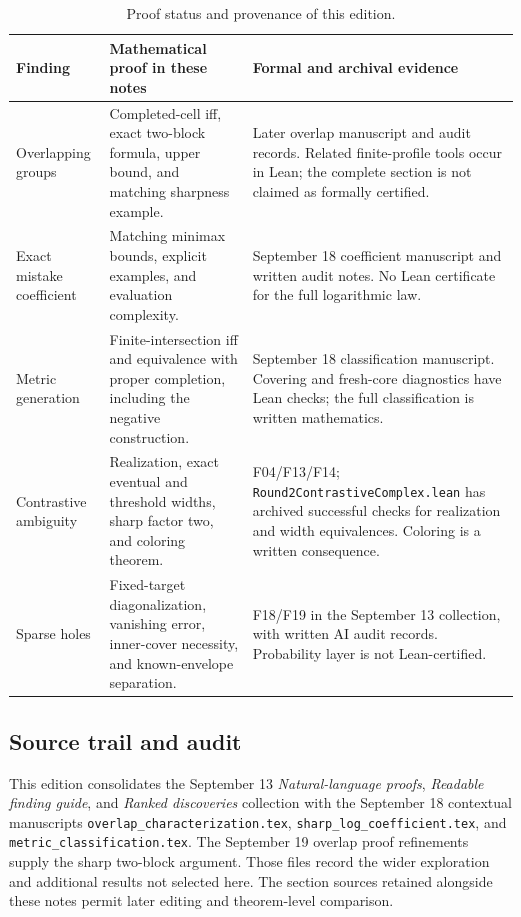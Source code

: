\begin{table}[H]
\centering\small
\caption{Proof status and provenance of this edition.}\label{tab:evidence}
\begin{tabularx}{\textwidth}{@{}p{}Y Y@{}}
\toprule
\textbf{Finding} & \textbf{Mathematical proof in these notes} & \textbf{Formal and archival evidence}\\
\midrule
Overlapping groups & Completed-cell iff, exact two-block formula, upper bound, and matching sharpness example. & Later overlap manuscript and audit records. Related finite-profile tools occur in Lean; the complete section is not claimed as formally certified.\\
\addlinespace
Exact mistake coefficient & Matching minimax bounds, explicit examples, and evaluation complexity. & September 18 coefficient manuscript and written audit notes. No Lean certificate for the full logarithmic law.\\
\addlinespace
Metric generation & Finite-intersection iff and equivalence with proper completion, including the negative construction. & September 18 classification manuscript. Covering and fresh-core diagnostics have Lean checks; the full classification is written mathematics.\\
\addlinespace
Contrastive ambiguity & Realization, exact eventual and threshold widths, sharp factor two, and coloring theorem. & F04/F13/F14; \texttt{Round2ContrastiveComplex.lean} has archived successful checks for realization and width equivalences. Coloring is a written consequence.\\
\addlinespace
Sparse holes & Fixed-target diagonalization, vanishing error, inner-cover necessity, and known-envelope separation. & F18/F19 in the September 13 collection, with written AI audit records. Probability layer is not Lean-certified.\\
\bottomrule
\end{tabularx}
\end{table}

\subsection*{Source trail and audit}
This edition consolidates the September 13 \emph{Natural-language proofs}, \emph{Readable finding guide}, and \emph{Ranked discoveries} collection with the September 18 contextual manuscripts \texttt{overlap\_\allowbreak characterization.tex}, \texttt{sharp\_log\_\allowbreak coefficient.tex}, and \texttt{metric\_\allowbreak classification.tex}. The September 19 overlap proof refinements supply the sharp two-block argument. Those files record the wider exploration and additional results not selected here. The section sources retained alongside these notes permit later editing and theorem-level comparison.

